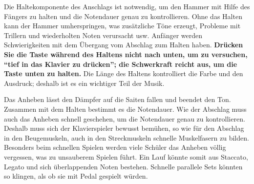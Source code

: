 Die Haltekomponente des Anschlags ist notwendig, um den Hammer mit Hilfe des Fängers zu halten und die Notendauer genau zu kontrollieren.
Ohne das Halten kann der Hammer umherspringen, was zusätzliche Töne erzeugt, Probleme mit Trillern und wiederholten Noten verursacht usw.
Anfänger werden Schwierigkeiten mit dem Übergang vom Abschlag zum Halten haben.
\textbf{Drücken Sie die Taste während des Haltens nicht nach unten, um zu versuchen, \enquote{tief in das Klavier zu drücken}; die Schwerkraft reicht aus, um die Taste unten zu halten.}
Die Länge des Haltens kontrolliert die Farbe und den Ausdruck; deshalb ist es ein wichtiger Teil der Musik.

Das Anheben lässt den Dämpfer auf die Saiten fallen und beendet den Ton.
Zusammen mit dem Halten bestimmt es die Notendauer.
Wie der Abschlag muss auch das Anheben schnell geschehen, um die Notendauer genau zu kontrollieren.
Deshalb muss sich der Klavierspieler bewusst bemühen, so wie für den Abschlag in den Beugemuskeln, auch in den Streckmuskeln schnelle Muskelfasern zu bilden.
Besonders beim schnellen Spielen werden viele Schüler das Anheben völlig vergessen, was zu unsauberem Spielen führt.
Ein Lauf könnte somit aus Staccato, Legato und sich überlappenden Noten bestehen.
Schnelle parallele Sets könnten so klingen, als ob sie mit Pedal gespielt würden.


